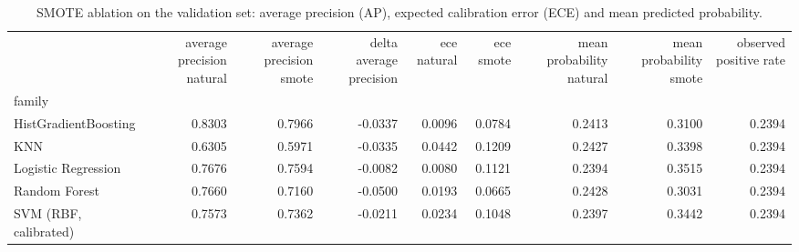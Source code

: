 \begin{table}
\caption{SMOTE ablation on the validation set: average precision (AP), expected calibration error (ECE) and mean predicted probability.}
\label{tab:smote}
\begin{tabular}{lrrrrrrrr}
\toprule
 & average precision natural & average precision smote & delta average precision & ece natural & ece smote & mean probability natural & mean probability smote & observed positive rate \\
family &  &  &  &  &  &  &  &  \\
\midrule
HistGradientBoosting & 0.8303 & 0.7966 & -0.0337 & 0.0096 & 0.0784 & 0.2413 & 0.3100 & 0.2394 \\
KNN & 0.6305 & 0.5971 & -0.0335 & 0.0442 & 0.1209 & 0.2427 & 0.3398 & 0.2394 \\
Logistic Regression & 0.7676 & 0.7594 & -0.0082 & 0.0080 & 0.1121 & 0.2394 & 0.3515 & 0.2394 \\
Random Forest & 0.7660 & 0.7160 & -0.0500 & 0.0193 & 0.0665 & 0.2428 & 0.3031 & 0.2394 \\
SVM (RBF, calibrated) & 0.7573 & 0.7362 & -0.0211 & 0.0234 & 0.1048 & 0.2397 & 0.3442 & 0.2394 \\
\bottomrule
\end{tabular}
\end{table}
